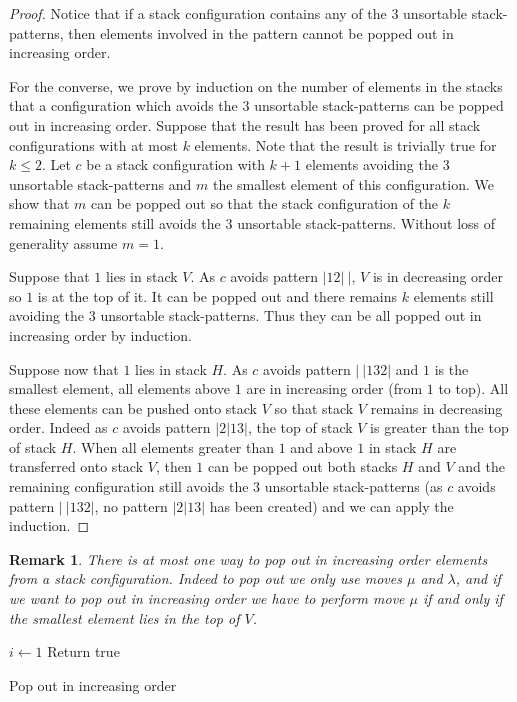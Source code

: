 \documentclass[11pt]{article}
\newtheorem{rem}[thm]{Remark}
\newcommand{\patternV}{\ensuremath{|12|\ |}\xspace}
\newcommand{\patternH}{\ensuremath{|\ |132|}\xspace}
\newcommand{\patternVH}{\ensuremath{|2|13|}\xspace}
\begin{document}
\begin{proof}
Notice that if a stack configuration contains any of the $3$ unsortable stack-patterns, then elements involved in the pattern cannot be popped out in increasing order.

For the converse, we prove by induction on the number of elements in the stacks that a configuration which avoids the $3$ unsortable stack-patterns can be popped out in increasing order. 
Suppose that the result has been proved for all stack configurations with at most $k$ elements. 
Note that the result is trivially true for $k \leq 2$. 
Let $c$ be a stack configuration with $k+1$ elements avoiding the $3$ unsortable stack-patterns and $m$ the smallest element of this configuration.
We show that $m$ can be popped out so that the stack configuration of the $k$ remaining elements still avoids the $3$ unsortable stack-patterns.
Without loss of generality assume $m = 1$.

Suppose that $1$ lies in stack $V$. 
As $c$ avoids pattern \patternV, $V$ is in decreasing order so $1$ is at the top of it. 
It can be popped out and there remains $k$ elements still avoiding the $3$ unsortable stack-patterns. 
Thus they can be all popped out in increasing order by induction. 

Suppose now that $1$ lies in stack $H$. 
As $c$ avoids pattern \patternH and $1$ is the smallest element, all elements above $1$ are in increasing order (from $1$ to top). 
All these elements can be pushed onto stack $V$ so that stack $V$ remains in decreasing order. 
Indeed as $c$ avoids pattern \patternVH , the top of stack $V$ is greater than the top of stack $H$. 
When all elements greater than $1$ and above $1$ in stack $H$ are transferred onto stack $V$, then $1$ can be popped out both stacks $H$ and $V$ and the remaining configuration still avoids the $3$ unsortable stack-patterns (as $c$ avoids pattern \patternH , no pattern \patternVH has been created) and we can apply the induction.
\end{proof}


\begin{rem}\label{rem:uniquePopOut}
There is at most one way to pop out in increasing order elements from a stack configuration. 
Indeed to pop out we only use moves $\mu$ and $\lambda$, and if we want to pop out in increasing order we have to perform move $\mu$ if and only if the smallest element lies in the top of $V$.
\end{rem}

\begin{algorithm}[H]
  \SetAlgoLined
\LinesNumbered
$i \longleftarrow 1$\;
Return true\;
 \caption{Pop out in increasing order\label{algo:popOut}}
\end{algorithm}
\end{document}
